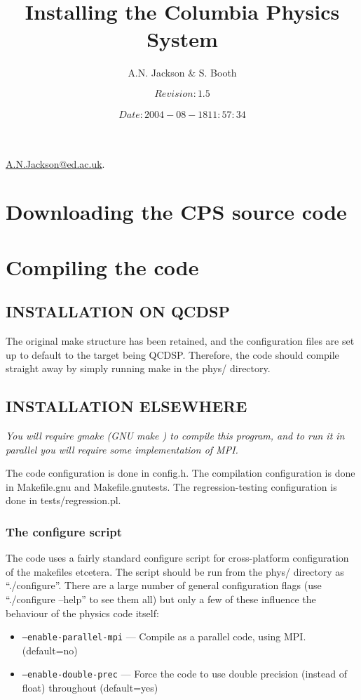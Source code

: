 \documentclass[12pt]{article}
\title{Installing the Columbia Physics System}
\author{A.N. Jackson \& S. Booth}
\date{\mbox{\small $$Revision: 1.5 $$  $$Date: 2004-08-18 11:57:34 $$}}
\begin{document}
\maketitle

\begin{flushright}
\href{mailto:A.N.Jackson@ed.ac.uk}{A.N.Jackson@ed.ac.uk}.
\end{flushright}

\tableofcontents

\newpage

\section{Downloading the CPS source code}

\section{Compiling the code}

\subsection{INSTALLATION ON QCDSP} 
The original make structure has been retained, and the configuration
files are set up to default to the target being QCDSP.  Therefore, the
code should compile straight away by simply running make in the phys/
directory.


\subsection{INSTALLATION ELSEWHERE}

{\large \emph{You will require gmake (GNU make ) to compile this program, and to
run it in parallel you will require some implementation of MPI.} }

The code configuration is done in config.h. The compilation
configuration is done in Makefile.gnu and Makefile.gnutests.  The
regression-testing configuration is done in tests/regression.pl.

\subsubsection{The configure script}
The code uses a fairly standard configure script for cross-platform
configuration of the makefiles etcetera.  The script should be run from the
phys/ directory as ``./configure''.  There are a large number of general
configuration flags (use ``./configure --help'' to see them all) but only a
few of these influence the behaviour of the physics code itself:
\begin{itemize}
 \item{\tt --enable-parallel-mpi} --- Compile as a parallel code, using MPI. (default=no) 
 \item{\tt --enable-double-prec} --- Force the code to use double precision (instead of float) throughout (default=yes) 
\end{itemize}
\end{document}
